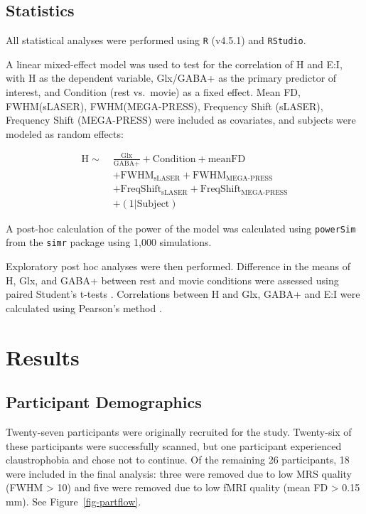 \documentclass[
true
]{sn-jnl}
\begin{document}
\subsection{Statistics}\label{statistics}

All statistical analyses were performed using \texttt{R}
\citep{rcoreteamLanguageEnvironmentStatistical2021} (v4.5.1) and
\texttt{RStudio}.

A linear mixed-effect model was used to test for the correlation of H
and E:I, with H as the dependent variable, Glx/GABA+ as the primary
predictor of interest, and Condition (rest vs.~movie) as a fixed effect.
Mean FD, FWHM(sLASER), FWHM(MEGA-PRESS), Frequency Shift (sLASER),
Frequency Shift (MEGA-PRESS) were included as covariates, and subjects
were modeled as random effects:

\[
\begin{aligned}
\mathrm{H} \sim\;& \frac{\mathrm{Glx}}{\mathrm{GABA\text{+}}} + \mathrm{Condition} +\mathrm{meanFD} \\ 
& + \mathrm{FWHM_{sLASER}} + \mathrm{FWHM_{MEGA\text{-}PRESS}} \\
& + \mathrm{FreqShift_{sLASER}} + \mathrm{FreqShift_{MEGA\text{-}PRESS}} \\
& + (1 | \mathrm{Subject})
\end{aligned}
\]

A post-hoc calculation of the power of the model was calculated using
\texttt{powerSim} from the \texttt{simr} package using 1,000
simulations.

Exploratory post hoc analyses were then performed. Difference in the
means of H, Glx, and GABA+ between rest and movie conditions were
assessed using paired Student's t-tests
\citep{studentProbableErrorMean1908}. Correlations between H and Glx,
GABA+ and E:I were calculated using Pearson's method
\citep{freedmanStatistics2007}.

\section{Results}\label{results}

\subsection{Participant Demographics}\label{participant-demographics}

Twenty-seven participants were originally recruited for the study.
Twenty-six of these participants were successfully scanned, but one
participant experienced claustrophobia and chose not to continue. Of the
remaining 26 participants, 18 were included in the final analysis: three
were removed due to low MRS quality (FWHM \textgreater{} 10) and five
were removed due to low fMRI quality (mean FD \textgreater{} 0.15 mm).
See Figure~\ref{fig-partflow}.
\end{document}
